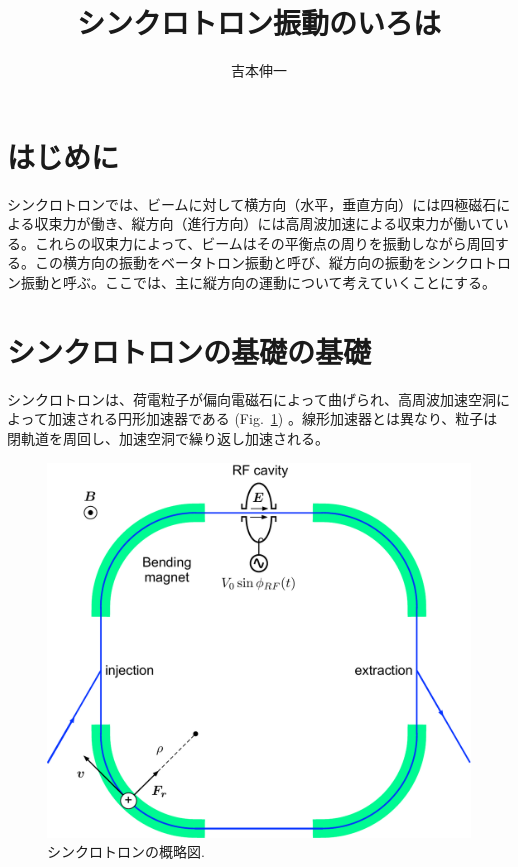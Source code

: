 \documentclass[10pt,a4paper]{jlreq}
\begin{document}
\title{シンクロトロン振動のいろは}
\author{吉本伸一}
\maketitle
\tableofcontents
\clearpage

\section{はじめに}
シンクロトロンでは、ビームに対して横方向（水平，垂直方向）には四極磁石による収束力が働き、縦方向（進行方向）には高周波加速による収束力が働いている。これらの収束力によって、ビームはその平衡点の周りを振動しながら周回する。この横方向の振動をベータトロン振動と呼び、縦方向の振動をシンクロトロン振動と呼ぶ。ここでは、主に縦方向の運動について考えていくことにする。

\section{シンクロトロンの基礎の基礎}
シンクロトロンは、荷電粒子が偏向電磁石によって曲げられ、高周波加速空洞によって加速される円形加速器である (Fig.~\ref{synchrotron}) 。線形加速器とは異なり、粒子は閉軌道を周回し、加速空洞で繰り返し加速される。
%
\begin{figure}[hbt]
  \begin{center}
    \includegraphics[width=12cm,clip]{figs/synchrotron.pdf}
    \caption{シンクロトロンの概略図.}
   \label{synchrotron}
  \end{center}
\end{figure}
\end{document}
